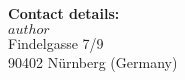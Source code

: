 
\vspace*{3\baselineskip}
\large{\textbf{Contact details:}}\\
$author$\\
Findelgasse 7/9 \\
90402 Nürnberg (Germany) \\
\newpage

